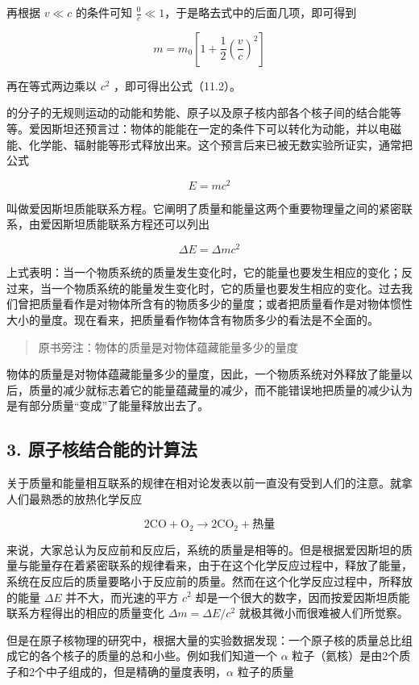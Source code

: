 再根据 \(v \ll c\) 的条件可知
\(\frac{0}{c} \ll 1\)，于是略去式中的后面几项，即可得到

\[
m = m _ {0} \left[ 1 + \frac {1}{2} \left(\frac {v}{c}\right) ^ {2} \right]
\]

再在等式两边乘以 \(c^{2}\) ，即可得出公式（11.2）。

的分子的无规则运动的动能和势能、原子以及原子核内部各个核子间的结合能等等。爱因斯坦还预言过：物体的能能在一定的条件下可以转化为动能，并以电磁能、化学能、辐射能等形式释放出来。这个预言后来已被无数实验所证实，通常把公式

\[
E = m c ^ {2} \tag {11.4}
\]

叫做爱因斯坦质能联系方程。它阐明了质量和能量这两个重要物理量之间的紧密联系，由爱因斯坦质能联系方程还可以列出

\[
\Delta E = \Delta m c ^ {2} \tag {11.5}
\]

上式表明：当一个物质系统的质量发生变化时，它的能量也要发生相应的变化；反过来，当一个物质系统的能量发生变化时，它的质量也要发生相应的变化。过去我们曾把质量看作是对物体所含有的物质多少的量度；或者把质量看作是对物体惯性大小的量度。现在看来，把质量看作物体含有物质多少的看法是不全面的。

\begin{quote}
原书旁注：物体的质量是对物体蕴藏能量多少的量度
\end{quote}

物体的质量是对物体蕴藏能量多少的量度，因此，一个物质系统对外释放了能量以后，质量的减少就标志着它的能量蕴藏量的减少，而不能错误地把质量的减少认为是有部分质量``变成''了能量释放出去了。

\subsection{3.
原子核结合能的计算法}

关于质量和能量相互联系的规律在相对论发表以前一直没有受到人们的注意。就拿人们最熟悉的放热化学反应

\[
2 \mathrm{CO} + \mathrm{O}_{2} \longrightarrow 2 \mathrm{CO}_{2} + \text{热量}
\]

来说，大家总认为反应前和反应后，系统的质量是相等的。但是根据爱因斯坦的质量与能量存在着紧密联系的规律看来，由于在这个化学反应过程中，释放了能量，系统在反应后的质量要略小于反应前的质量。然而在这个化学反应过程中，所释放的能量
\(\Delta E\) 并不大，而光速的平方 \(c^2\)
却是一个很大的数字，因而按爱因斯坦质能联系方程得出的相应的质量变化
\(\Delta m = \Delta E / c^2\) 就极其微小而很难被人们所觉察。

但是在原子核物理的研究中，根据大量的实验数据发现：一个原子核的质量总比组成它的各个核子的质量的总和小些。例如我们知道一个
\(\alpha\)
粒子（氦核）是由2个质子和2个中子组成的，但是精确的量度表明，\(\alpha\)
粒子的质量

